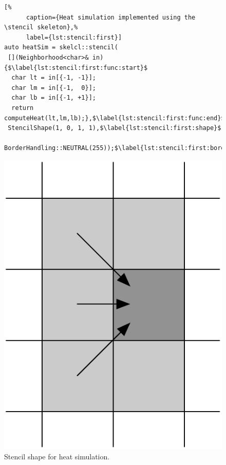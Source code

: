 \begin{figure}[t]
  \begin{minipage}[b]{.55\textwidth}
    \begin{lstlisting}[%
      caption={Heat simulation implemented using the \stencil skeleton},%
      label={lst:stencil:first}]
auto heatSim = skelcl::stencil(
 [](Neighborhood<char>& in) {$\label{lst:stencil:first:func:start}$
  char lt = in[{-1, -1}];
  char lm = in[{-1,  0}];
  char lb = in[{-1, +1}];
  return computeHeat(lt,lm,lb);},$\label{lst:stencil:first:func:end}$
 StencilShape(1, 0, 1, 1),$\label{lst:stencil:first:shape}$
 BorderHandling::NEUTRAL(255));$\label{lst:stencil:first:border}$
    \end{lstlisting}
  \end{minipage}%
  \hfill%
  \begin{minipage}[b]{.38\textwidth}
    \centering
    \includegraphics[width=.65\textwidth]{Figures/HiStencils/heat_transfer}
    \caption{Stencil shape for heat simulation.\vspace{.9em}}
    \label{fig:stencil:first:shape}
  \end{minipage}
\end{figure}

